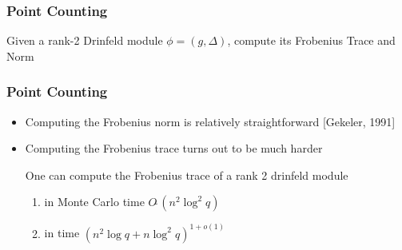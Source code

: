 \documentclass{beamer}
\newcommand{\f}{\mathbb{F}}
\begin{document}
\begin{frame}
\frametitle{Point Counting}

\begin{problem}
Given a rank-2 Drinfeld module $\phi = (g,\Delta)$, compute its Frobenius Trace and Norm
\end{problem}

\end{frame}










\begin{frame}
\frametitle{Point Counting}

\begin{itemize}
\item Computing the Frobenius norm is relatively straightforward [Gekeler, 1991]
\item Computing the Frobenius trace turns out to be much harder

\begin{theorem}
One can compute the Frobenius trace of a rank 2 drinfeld module
\begin{enumerate}
\item in Monte Carlo time $O\tilde{~}(n^2 \log^2 q)$
\item in time $(n^2 \log q + n \log^2 q)^{1+o(1)}$

\end{enumerate}
\end{theorem}

\end{itemize}


\end{frame}
\end{document}
